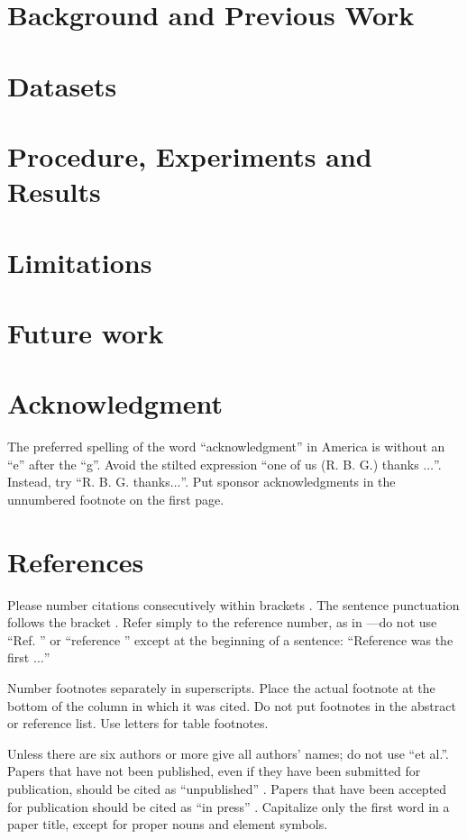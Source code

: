 \documentclass[conference]{IEEEtran}
\begin{document}
\section{Background and Previous Work}

\section{Datasets}

\section{Procedure, Experiments and Results}

\section{Limitations}

\section{Future work}

\section{Acknowledgment}

The preferred spelling of the word ``acknowledgment'' in America is without
an ``e'' after the ``g''. Avoid the stilted expression ``one of us (R. B.
G.) thanks $\ldots$''. Instead, try ``R. B. G. thanks$\ldots$''. Put sponsor
acknowledgments in the unnumbered footnote on the first page.

\section{References}

Please number citations consecutively within brackets \cite{b1}. The
sentence punctuation follows the bracket \cite{b2}. Refer simply to the reference
number, as in \cite{b3}---do not use ``Ref. \cite{b3}'' or ``reference \cite{b3}'' except at
the beginning of a sentence: ``Reference \cite{b3} was the first $\ldots$''

Number footnotes separately in superscripts. Place the actual footnote at
the bottom of the column in which it was cited. Do not put footnotes in the
abstract or reference list. Use letters for table footnotes.

Unless there are six authors or more give all authors' names; do not use
``et al.''. Papers that have not been published, even if they have been
submitted for publication, should be cited as ``unpublished'' \cite{b4}. Papers
that have been accepted for publication should be cited as ``in press'' \cite{b5}.
Capitalize only the first word in a paper title, except for proper nouns and
element symbols.
\end{document}

